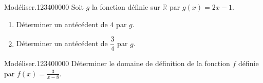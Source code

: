\begin{pageAD}
\begin{ExoCad}{Modéliser.}{1234}{0}{0}{0}{0}{0}
Soit $g$ la fonction définie sur $\mathbb R$ par $g(x)=2x-1$. 

\begin{enumerate}
\item Déterminer un antécédent de $4$ par $g$.  

\item Déterminer un antécédent de $\dfrac{3}{4}$ par $g$.  

\end{enumerate}
\end{ExoCad}


\begin{ExoCad}{Modéliser.}{1234}{0}{0}{0}{0}{0}
Déterminer le domaine de définition de la fonction $f$ définie par $f(x)=\frac{3}{x-8}$. 
\end{ExoCad}

\end{pageAD} 


